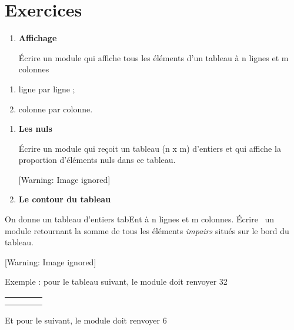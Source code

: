 \section[Exercices]{ Exercices}
\liststyleExercice
\begin{enumerate}
\item {\sffamily\bfseries
Affichage}

{
Écrire un module qui affiche tous les éléments d'un
tableau à n lignes et m colonnes}
\end{enumerate}
\begin{enumerate}
\item {
ligne par ligne ;}
\item {
colonne par colonne.}
\end{enumerate}
\liststyleExercice
\begin{enumerate}
\item {\sffamily\bfseries
Les nuls}

{
Écrire un module qui reçoit un tableau (n x m)
d'entiers et qui affiche la proportion
d'éléments nuls dans ce tableau.}
\begin{center}
 [Warning: Image ignored] %

\end{center}
\item {\sffamily\bfseries
Le contour du tableau}
\end{enumerate}
{
On donne un tableau d’entiers tabEnt à n lignes et m colonnes. Écrire
\ un module retournant la somme de tous les éléments \textit{impairs}
situés sur le bord du tableau.}

\begin{center}
 [Warning: Image ignored] %

\end{center}
{
Exemple : pour le tableau suivant, le module doit renvoyer 32}

\begin{center}
\tablehead{}
\begin{supertabular}{|m{0.62200004cm}|m{0.624cm}|m{0.624cm}|m{0.64100003cm}|}
\hline
{} &
 &
 &
\raggedleft{}\\\hline
{} &
 &
 &
\raggedleft{}\\\hline
{} &
 &
 &
\raggedleft{}\\\hline
\end{supertabular}
\end{center}
{
Et pour le suivant, le module doit renvoyer 6}

